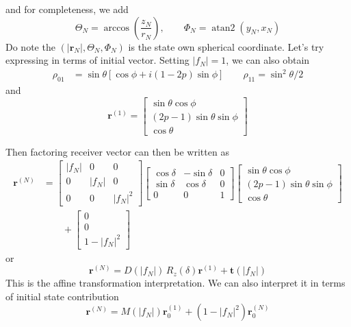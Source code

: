 \documentclass[../../../main.tex]{subfiles}
\begin{document}
and for completeness, we add
\begin{equation*}
  \Theta_N=\arccos\left(\frac{z_N}{r_N}\right),
  \qquad
  \Phi_N=\operatorname{atan2}(y_N,x_N)
\end{equation*}
Do note the $(|\mathbf{r}_N|,\Theta_N,\Phi_N)$ is the state own spherical coordinate.
Let's try expressing in terms of initial vector.
Setting $|f_N|=1$, we can also obtain
\begin{align*}
  \rho_{01} & =  \sin \theta [\cos \phi + i(1-2p)\sin \phi]\qquad
  \rho_{11} = \sin ^2\theta/2
\end{align*}
and
\begin{equation*}
  \mathbf r^{(1)} =
  \begin{bmatrix} \sin\theta\cos\phi\\ (2p-1)\sin\theta\sin\phi\\ \cos\theta \end{bmatrix}
\end{equation*}

Then factoring receiver vector can then be written as
\begin{align*}
  \mathbf r^{(N)} & =
  \begin{bmatrix} |f_N|&0&0\\ 0&|f_N|&0\\ 0&0&|f_N|^2 \end{bmatrix}
  \begin{bmatrix}
    \cos\delta  & -\sin\delta & 0 \\
    \sin\delta & \cos\delta & 0 \\
    0           & 0          & 1
  \end{bmatrix}
  \begin{bmatrix} \sin\theta\cos\phi\\ (2p-1)\sin\theta\sin\phi\\ \cos\theta \end{bmatrix} \\
                  & \qquad+ \begin{bmatrix} 0\\ 0\\ 1-|f_N|^2 \end{bmatrix}
\end{align*}
or
\begin{equation*}
  \mathbf r^{(N)}  =  D(|f_N|)\,R_z(\delta) \mathbf r^{(1)} +\mathbf t(|f_N|)
\end{equation*}
This is the affine transformation interpretation.
We can also interpret it in terms of initial state contribution
\begin{equation*}
  \mathbf r^{(N)}  =  M(|f_N|) \mathbf r^{(1)}_0 +(1-|f_N|^2)\mathbf r^{(N)}_0
\end{equation*}
\end{document}
